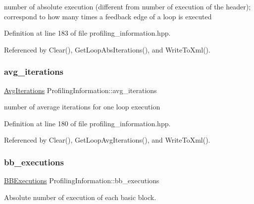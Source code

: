 number of absolute execution (different from number of execution of the header); correspond to how many times a feedback edge of a loop is executed 



Definition at line 183 of file profiling\+\_\+information.\+hpp.



Referenced by Clear(), Get\+Loop\+Abs\+Iterations(), and Write\+To\+Xml().

\mbox{\label{classProfilingInformation_a17172675a0452f39d0df2617044c61a0}} 
\subsubsection{\texorpdfstring{avg\+\_\+iterations}{avg\_iterations}}
{\footnotesize\ttfamily \hyperlink{classAvgIterations}{Avg\+Iterations} Profiling\+Information\+::avg\+\_\+iterations\hspace{0.3cm}{\ttfamily [private]}}



number of average iterations for one loop execution 



Definition at line 180 of file profiling\+\_\+information.\+hpp.



Referenced by Clear(), Get\+Loop\+Avg\+Iterations(), and Write\+To\+Xml().

\mbox{\label{classProfilingInformation_ab7533fd1f99a3614f64fa4689f8cb6b0}} 
\subsubsection{\texorpdfstring{bb\+\_\+executions}{bb\_executions}}
{\footnotesize\ttfamily \hyperlink{classBBExecutions}{B\+B\+Executions} Profiling\+Information\+::bb\+\_\+executions\hspace{0.3cm}{\ttfamily [private]}}



Absolute number of execution of each basic block. 



